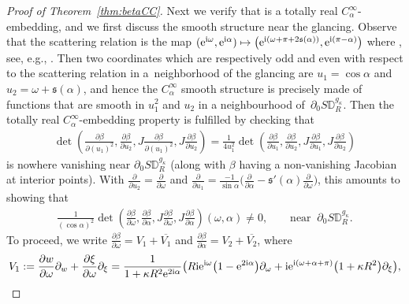 \documentclass[10pt,a4paper]{amsart}
\numberwithin{equation}{section}
\theoremstyle{definition}
\newcommand{\1}{{\bf 1}}
\newcommand \Dm { \mathbb{D}}
\renewcommand \ss {\mathfrak s}
\begin{document}
\begin{proof}[Proof of Theorem~\ref{thm:betaCC}]
Next we verify that \smash{$\beta|_{ {\partial_+ S\Dm_R^{g_\kappa}}}$} is a totally real $C_\alpha^\infty$-embedding, and we first discuss the smooth structure near the glancing. Observe that the scattering relation is the map $({\rm e}^{{\rm i}\omega},{\rm e}^{{\rm i}\alpha})\mapsto \bigl({\rm e}^{{\rm i}(\omega+\pi+2\ss(\alpha))}, {\rm e}^{{\rm i}(\pi-\alpha)}\bigr)$ where \smash{$\ss(\alpha) := \tan^{-1} \bigl( \frac{1-\kappa R^2}{1+\kappa R^2} \tan\alpha\bigr)$}, see, e.g., \cite[Section~4.1]{Monard2020}. Then two coordinates which are respectively odd and even with respect to the scattering relation in a~neighborhood of the glancing are $u_1 = \cos\alpha$ and $u_2 = \omega + \ss(\alpha)$, and hence the $C_\alpha^\infty$ smooth structure is precisely made of functions that are smooth in $u_1^2$ and $u_2$ in a neighbourhood of~$\partial_0 S\Dm_R^{g_\kappa}$. Then the totally real $C_\alpha^\infty$-embedding property is fulfilled by checking that
	\begin{align*}
		\det \left(\frac{\partial\beta}{\partial (u_1)^2}, \frac{\partial\beta}{\partial u_2}, J \frac{\partial\beta}{\partial (u_1)^2}, J\frac{\partial\beta}{\partial u_2}\right) = \frac{1}{4 u_1^2}\det \left(\frac{\partial\beta}{\partial u_1}, \frac{\partial\beta}{\partial u_2}, J \frac{\partial\beta}{\partial u_1}, J \frac{\partial\beta}{\partial u_2}\right)
	\end{align*}
	is nowhere vanishing near $\partial_0 S\Dm_R^{g_\kappa}$ (along with $\beta$ having a non-vanishing Jacobian at interior points). With $\frac{\partial}{\partial u_2} = \frac{\partial}{\partial \omega}$ and $\frac{\partial}{\partial u_1} = \frac{-1}{\sin\alpha} \bigl(\frac{\partial}{\partial\alpha} - \ss'(\alpha) \frac{\partial}{\partial\omega}\bigr)$, this amounts to showing that
	\begin{align*}
		\frac{1}{(\cos\alpha)^2}\det \left(\frac{\partial\beta}{\partial\omega}, \frac{\partial\beta}{\partial\alpha}, J \frac{\partial\beta}{\partial\omega}, J\frac{\partial\beta}{\partial\alpha}\right) (\omega,\alpha) \ne 0, \qquad \text{near }\ \partial_0 S\Dm_R^{g_\kappa}.
	\end{align*}
	To proceed, we write $\frac{\partial\beta}{\partial\omega} = V_1 + \overline{V_1}$ and $\frac{\partial\beta}{\partial\alpha} = V_2 + \overline{V_2}$, where
	\begin{align*}
		&V_1:= \frac{\partial w}{\partial\omega}\partial_w + \frac{\partial\xi}{\partial\omega} \partial_\xi = \frac{1}{1+\kappa R^2 {\rm e}^{2{\rm i}\alpha}} \bigl( R{\rm i} {\rm e}^{{\rm i}\omega} \bigl(1-{\rm e}^{2{\rm i}\alpha}\bigr) \partial_\omega + {\rm i} {\rm e}^{{\rm i}(\omega+\alpha+\pi)} \bigl(1+\kappa R^2\bigr) \partial_\xi\bigr), \\

\end{align*}
\end{proof}
\end{document}
